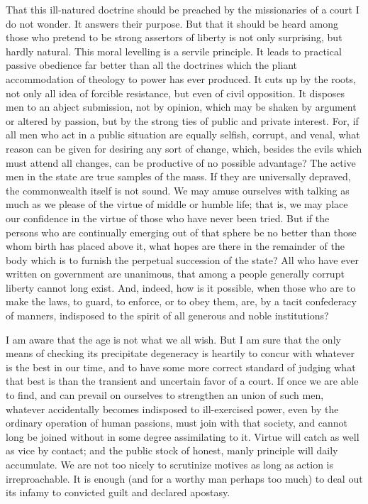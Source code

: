 That this ill-natured doctrine should be preached by the missionaries of a court I do not wonder. It answers their purpose. But that it should be heard among those who pretend to be strong assertors of liberty is not only surprising, but hardly natural. This moral levelling is a servile principle. It leads to practical passive obedience far better than all the doctrines which the pliant accommodation of theology to power has ever produced. It cuts up by the roots, not only all idea of forcible resistance, but even of civil opposition. It disposes men to an abject submission, not by opinion, which may be shaken by argument or altered by passion, but by the strong ties of public and private interest. For, if all men who act in a public situation are equally selfish, corrupt, and venal, what reason can be given for desiring any sort of change, which, besides the evils which must attend all changes, can be productive of no possible advantage? The active men in the state are true samples of the mass. If they are universally depraved, the commonwealth itself is not sound. We may amuse ourselves with talking as much as we please of the virtue of middle or humble life; that is, we may place our confidence in the virtue of those who have never been tried. But if the persons who are continually emerging out of that sphere be no better than those whom birth has placed above it, what hopes are there in the remainder of the body which is to furnish the perpetual succession of the state? All who have ever written on government are unanimous, that among a people generally corrupt liberty cannot long exist. And, indeed, how is it possible, when those who are to make the laws, to guard, to enforce, or to obey them, are, by a tacit confederacy of manners, indisposed to the spirit of all generous and noble institutions?

I am aware that the age is not what we all wish. But I am sure that the only means of checking its precipitate degeneracy is heartily to concur with whatever is the best in our time, and to have some more correct standard of judging what that best is than the transient and uncertain favor of a court. If once we are able to find, and can prevail on ourselves to strengthen an union of such men, whatever accidentally becomes indisposed to ill-exercised power, even by the ordinary operation of human passions, must join with that society, and cannot long be joined without in some degree assimilating to it. Virtue will catch as well as vice by contact; and the public stock of honest, manly principle will daily accumulate. We are not too nicely to scrutinize motives as long as action is irreproachable. It is enough (and for a worthy man perhaps too much) to deal out its infamy to convicted guilt and declared apostasy.

